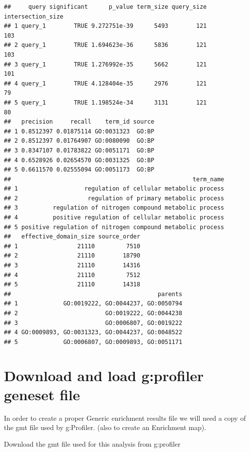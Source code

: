 \documentclass[
]{book}
\begin{document}
\begin{verbatim}
##     query significant      p_value term_size query_size intersection_size
## 1 query_1        TRUE 9.272751e-39      5493        121               103
## 2 query_1        TRUE 1.694623e-36      5836        121               103
## 3 query_1        TRUE 1.276992e-35      5662        121               101
## 4 query_1        TRUE 4.128404e-35      2976        121                79
## 5 query_1        TRUE 1.198524e-34      3131        121                80
##   precision     recall    term_id source
## 1 0.8512397 0.01875114 GO:0031323  GO:BP
## 2 0.8512397 0.01764907 GO:0080090  GO:BP
## 3 0.8347107 0.01783822 GO:0051171  GO:BP
## 4 0.6528926 0.02654570 GO:0031325  GO:BP
## 5 0.6611570 0.02555094 GO:0051173  GO:BP
##                                                    term_name
## 1                   regulation of cellular metabolic process
## 2                    regulation of primary metabolic process
## 3          regulation of nitrogen compound metabolic process
## 4          positive regulation of cellular metabolic process
## 5 positive regulation of nitrogen compound metabolic process
##   effective_domain_size source_order
## 1                 21110         7510
## 2                 21110        18790
## 3                 21110        14316
## 4                 21110         7512
## 5                 21110        14318
##                                          parents
## 1             GO:0019222, GO:0044237, GO:0050794
## 2                         GO:0019222, GO:0044238
## 3                         GO:0006807, GO:0019222
## 4 GO:0009893, GO:0031323, GO:0044237, GO:0048522
## 5             GO:0006807, GO:0009893, GO:0051171
\end{verbatim}

\hypertarget{download-and-load-gprofiler-geneset-file}{%
\section{Download and load g:profiler geneset file}\label{download-and-load-gprofiler-geneset-file}}

In order to create a proper Generic enrichment results file we will need a copy of the gmt file used by g:Profiler. (also to create an Enrichment map).

Download the gmt file used for this analysis from g:profiler
\end{document}
